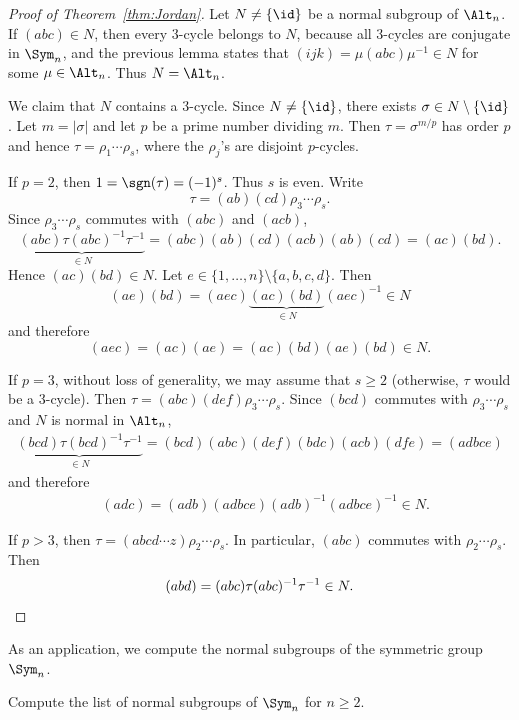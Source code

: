 \begin{proof}[Proof of Theorem~\ref{thm:Jordan}]
Let $N\ne\{\id\}$ be a normal subgroup of $\Alt_n$. If $(abc)\in N$, then every 3-cycle belongs to $N$, because all 3-cycles 
are conjugate in $\Sym_n$, and the previous lemma 
states that 
$(ijk)=\mu(abc)\mu^{-1}\in N$ for some
$\mu\in\Alt_n$. Thus $N=\Alt_n$. 

We claim that $N$ contains a 3-cycle. 
Since $N\ne\{\id\}$, there exists $\sigma\in N\setminus\{\id\}$. Let $m=|\sigma|$ and let $p$ be a prime number dividing $m$. 
Then $\tau=\sigma^{m/p}$ has order $p$ and hence
$\tau=\rho_1\cdots\rho_s$, where the $\rho_j$'s are disjoint 
$p$-cycles. 

If $p=2$, then $1=\sgn(\tau)=(-1)^s$. Thus $s$ is even. Write
\[
\tau=(ab)(cd)\rho_3\cdots\rho_s. 
\]
Since $\rho_3\cdots\rho_s$ commutes with $(abc)$ and $(acb)$, 
\[
\underbrace{(abc)\tau(abc)^{-1}\tau^{-1}}_{\in N}
=(abc)(ab)(cd)(acb)(ab)(cd)=(ac)(bd).
\]
Hence $(ac)(bd)\in N$. Let 
$e\in\{1,\dots,n\}\setminus\{a,b,c,d\}$. Then 
\[
(ae)(bd)=(aec)\underbrace{(ac)(bd)}_{\in N}(aec)^{-1}\in N
\]
and therefore  
\[
(aec)=(ac)(ae)=(ac)(bd)(ae)(bd)\in N.
\]

If $p=3$, without loss of generality, we may assume that $s\geq2$ (otherwise, $\tau$ would be a 3-cycle). Then
$\tau=(abc)(def)\rho_3\cdots\rho_s$. Since $(bcd)$ commutes with
$\rho_3\cdots\rho_s$ and $N$ is normal in $\Alt_n$, 
\begin{align*}
\underbrace{(bcd)\tau(bcd)^{-1}\tau^{-1}}_{\in N}=(bcd)(abc)(def)(bdc)(acb)(dfe)=(adbce)
\end{align*}
and therefore 
\begin{align*}
&(adc)=(adb)(adbce)(adb)^{-1}(adbce)^{-1}\in N.
\end{align*}

If $p>3$, then $\tau=(abcd\cdots z)\rho_2\cdots\rho_s$. In particular, $(abc)$ commutes with $\rho_2\cdots\rho_s$. Then 
\[
(abd)=(abc)\tau(abc)^{-1}\tau^{-1}\in N.\qedhere
\]
\end{proof}

As an application, we compute the normal subgroups 
of the symmetric group $\Sym_n$. 

\begin{exercise}
    Compute the list of normal subgroups of $\Sym_n$ for $n\geq2$. 
\end{exercise}

